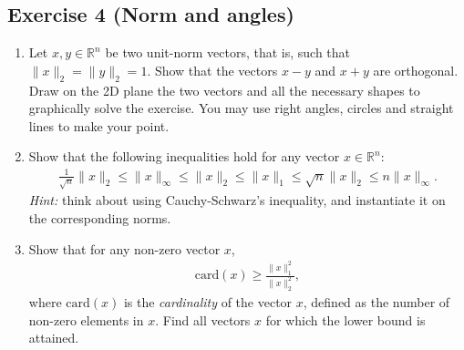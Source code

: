 \documentclass[11pt]{article}
\begin{document}
\newpage
\subsection*{Exercise 4 (Norm and angles)}

\begin{enumerate}
    \item Let $x,y\in\mathbb{R}^{n}$ be two unit-norm vectors, that is, such that $\|x\|_2 = \|y\|_2=1$. Show that the vectors $x-y$ and $x+y$ are orthogonal. Draw on the 2D plane the two vectors and all the necessary shapes to graphically solve the exercise. You may use right angles, circles and straight lines to make your point.

    \item
    Show that the following inequalities hold for any vector $x \in \mathbb{R}^{n}$:
    \begin{align*}
        \frac{1}{\sqrt{n}}\|x\|_2 \leq \|x\|_\infty \leq  \|x\|_2 \leq \|x\|_1 \leq \sqrt{n} \|x\|_2 \le n\|x\|_\infty.
    \end{align*}
    \textit{Hint:} think about using Cauchy-Schwarz's inequality, and instantiate it on the corresponding norms.

    \item Show that for any non-zero vector $x$,
    \begin{align*}
        \text{card}(x) \ge \frac{\|x\|_1^2}{\|x\|_2^2},
    \end{align*}
    where $\text{card}(x)$ is the \emph{cardinality} of the vector $x$, defined as the number of non-zero elements in $x$. Find all vectors $x$ for which the lower bound is attained.
\end{enumerate}
\end{document}
